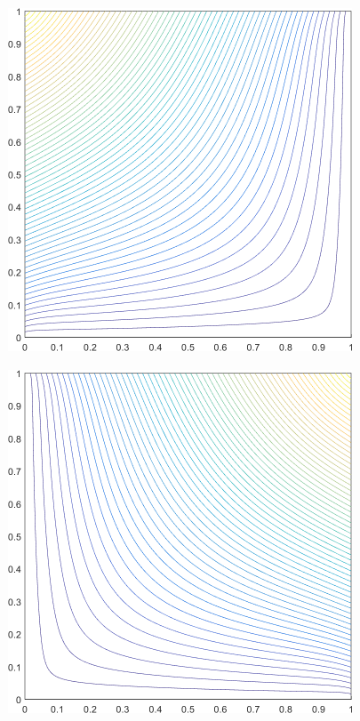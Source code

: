 \begin{figure}
\centering
	\begin{subfigure}[b]{0.39\textwidth}
		\centering
		\includegraphics[width=\textwidth]{figures/sec_BF/square_MV1_contour_b4.png}
		\caption{}
	\end{subfigure}
	\hspace{1.5cm}
	\begin{subfigure}[b]{0.39\textwidth}
		\centering
		\includegraphics[width=\textwidth]{figures/sec_BF/square_MV1_contour_b3.png}

\end{subfigure}
\end{figure}
